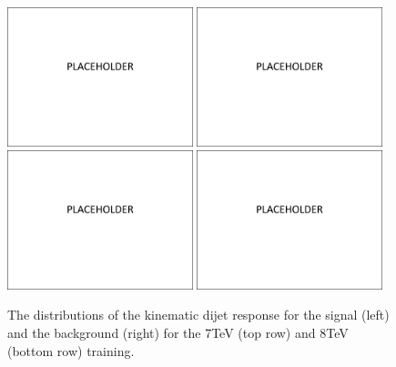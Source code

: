 \begin{figure}
  \includegraphics[width=0.48\textwidth]{placeholder.pdf}
  \includegraphics[width=0.48\textwidth]{placeholder.pdf} \\
  \includegraphics[width=0.48\textwidth]{placeholder.pdf}
  \includegraphics[width=0.48\textwidth]{placeholder.pdf}
  \caption{The distributions of the kinematic dijet \BDT response for the \VBF signal (left) and the background (right) for the 7TeV (top row) and 8TeV (bottom row) training.}
  \label{fig:vbf_dijet_kin}
\end{figure}

